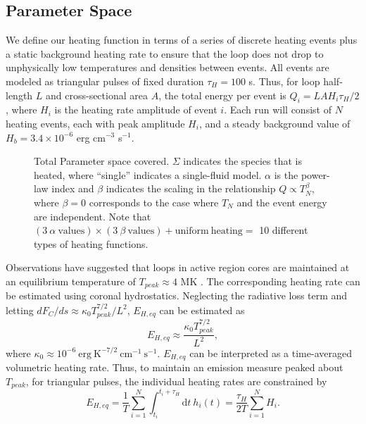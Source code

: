\documentclass[apj]{emulateapj}
\begin{document}
	\subsection{Parameter Space}
	\label{subsec:params}
	\par We define our heating function in terms of a series of discrete heating events plus a static background heating rate to ensure that the loop does not drop to unphysically low temperatures and densities between events. All events are modeled as triangular pulses of fixed duration $\tau_H=100$ s. Thus, for loop half-length $L$ and cross-sectional area $A$, the total energy per event is $Q_i=LAH_i\tau_H/2$, where $H_i$ is the heating rate amplitude of event $i$. Each run will consist of $N$ heating events, each with peak amplitude $H_i$, and a steady background value of $H_b=3.4\times10^{-6}$ erg cm$^{-3}$ s$^{-1}$.
	\begin{figure}
		\centering
		
		\caption{Total Parameter space covered. $\Sigma$ indicates the species that is heated, where ``single'' indicates a single-fluid model. $\alpha$ is the power-law index and $\beta$ indicates the scaling in the relationship $Q\propto T_N^{\beta}$, where $\beta=0$ corresponds to the case where $T_N$ and the event energy are independent. Note that $(3~\alpha~\mathrm{values})\times(3~\beta~\mathrm{values})+\mathrm{uniform~heating}=$ 10 different types of heating functions.}
		\label{fig:parameter_space}
	\end{figure}
	\par Observations have suggested that loops in active region cores are maintained at an equilibrium temperature of $T_{peak}\approx4$ MK \citep{warren_constraints_2011,warren_systematic_2012}. The corresponding heating rate can be estimated using coronal hydrostatics. Neglecting the radiative loss term and letting $dF_C/ds\approx\kappa_0T_{peak}^{7/2}/L^2$, $E_{H,eq}$ can be estimated as 
	\begin{equation}
		\label{eq:heating_rate_est}
		E_{H,eq} \approx \frac{\kappa_0T_{peak}^{7/2}}{L^2},
	\end{equation}
	where $\kappa_0\approx10^{-6}~\mathrm{erg}~\mathrm{K}^{-7/2}~\mathrm{cm}^{-1}~\mathrm{s}^{-1}$. $E_{H,eq}$ can be interpreted as a time-averaged volumetric heating rate. Thus, to maintain an emission measure peaked about $T_{peak}$, for triangular pulses, the individual heating rates are constrained by 
	\begin{equation}
		\label{eq:heating_rate_constraint}
		E_{H,eq} = \frac{1}{T}\sum_{i=1}^N\int_{t_i}^{t_i+\tau_H}\mathrm{d}t~h_i(t) = \frac{\tau_H}{2T}\sum_{i=1}^NH_i.
	\end{equation}
\end{document}
